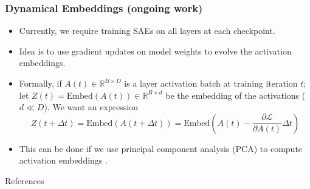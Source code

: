 \documentclass{beamer}
\begin{document}
\begin{frame}
\frametitle{Dynamical Embeddings (ongoing work)}
\begin{itemize}
    \item Currently, we require training SAEs on all layers at each checkpoint.
    \item Idea is to use gradient updates on model weights to evolve the activation embeddings.
    \item Formally, if $A(t) \in \mathbb{R}^{B \times D}$ is a layer activation batch at training iteration $t$; let $Z(t) = \mathrm{Embed}(A(t)) \in \mathbb{R}^{B \times d}$ be the embedding of the activations ($d \ll D$). We want an expression \[
    Z(t + \Delta t) = \mathrm{Embed}(A(t + \Delta t)) = \mathrm{Embed}\left(A(t) - \frac{\partial \mathcal L}{\partial A(t)} \Delta t\right)
    \]
    \item This can be done if we use principal component analysis (PCA) to compute activation embeddings \cite{koch2007dynamical,schotthofer2022lowranklottery}.
\end{itemize}
\end{frame}


\begin{frame}{References}
    \footnotesize
    
    
\end{frame}
\end{document}
